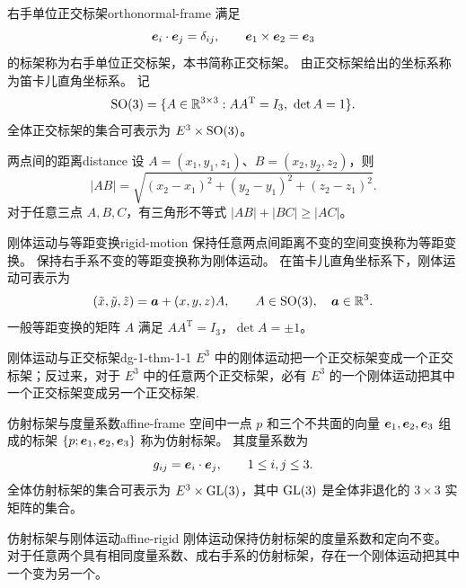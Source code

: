 \begin{definition}{右手单位正交标架}{orthonormal-frame}
满足
\[
\boldsymbol{e}_i\cdot\boldsymbol{e}_j=\delta_{ij},\qquad
\boldsymbol{e}_1\times\boldsymbol{e}_2=\boldsymbol{e}_3
\]
的标架称为右手单位正交标架，本书简称正交标架。
由正交标架给出的坐标系称为笛卡儿直角坐标系。
记
\[
\SO(3)=\{A\in\R^{3\times3}:AA^{\mathrm T}=I_3,\ \det A=1\}.
\]
全体正交标架的集合可表示为 $E^3\times\operatorname{SO}(3)$。
\end{definition}

\begin{proposition}{两点间的距离}{distance}
设 $A=(x_1,y_1,z_1)$、$B=(x_2,y_2,z_2)$，则
\[
|AB|=\sqrt{(x_2-x_1)^2+(y_2-y_1)^2+(z_2-z_1)^2}.
\]
对于任意三点 $A,B,C$，有三角形不等式 $|AB|+|BC|\geq|AC|$。
\end{proposition}

\begin{definition}{刚体运动与等距变换}{rigid-motion}
保持任意两点间距离不变的空间变换称为等距变换。
保持右手系不变的等距变换称为刚体运动。
在笛卡儿直角坐标系下，刚体运动可表示为
\[
(\tilde x,\tilde y,\tilde z)=\boldsymbol{a}+(x,y,z)A,\qquad
A\in\operatorname{SO}(3),\quad\boldsymbol{a}\in\mathbb{R}^3.
\]
一般等距变换的矩阵 $A$ 满足 $AA^{\mathrm T}=I_3$，$\det A=\pm1$。
\end{definition}

\begin{theorem}{刚体运动与正交标架}{dg-1-thm-1-1}
\(E^{3}\)  中的刚体运动把一个正交标架变成一个正交标架；反过来，对于  \(E^{3}\)  中的任意两个正交标架，必有  \(E^{3}\)  的一个刚体运动把其中一个正交标架变成另一个正交标架.
\end{theorem}

\begin{definition}{仿射标架与度量系数}{affine-frame}
空间中一点 $p$ 和三个不共面的向量 $\boldsymbol{e}_1,\boldsymbol{e}_2,\boldsymbol{e}_3$
组成的标架 $\{p;\boldsymbol{e}_1,\boldsymbol{e}_2,\boldsymbol{e}_3\}$ 称为仿射标架。
其度量系数为
\[
g_{ij}=\boldsymbol{e}_i\cdot\boldsymbol{e}_j,\qquad1\leq i,j\leq3.
\]
全体仿射标架的集合可表示为 $E^3\times\operatorname{GL}(3)$，其中 $\operatorname{GL}(3)$ 是全体非退化的 $3\times3$ 实矩阵的集合。
\end{definition}

\begin{proposition}{仿射标架与刚体运动}{affine-rigid}
刚体运动保持仿射标架的度量系数和定向不变。
对于任意两个具有相同度量系数、成右手系的仿射标架，存在一个刚体运动把其中一个变为另一个。
\end{proposition}

